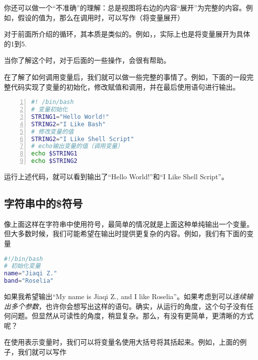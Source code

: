 \begin{extend}
    你还可以做一个“不准确”的理解：\code{\$}总是视图将右边的内容“展开”为完整的内容。例如，假设的值为，那么在调用时，可以写作（将变量展开）

    对于前面所介绍的循环，其本质是类似的。例如，，实际上也是将变量展开为具体的1到5.

    当你了解这个时，对于后面的一些操作，会很有帮助。
\end{extend}

在了解了如何调用变量后，我们就可以做一些完整的事情了。例如，下面的一段完整代码实现了变量的初始化，修改赋值和调用，并在最后使用语句进行输出。

\begin{lstlisting}[language=bash,caption=variable,numbers=left]
#! /bin/bash
# 变量初始化
STRING1="Hello World!"
STRING2="I Like Bash"
# 修改变量的值
STRING2="I Like Shell Script"
# echo输出变量的值（调用变量）
echo $STRING1
echo $STRING2
\end{lstlisting}

运行上述代码，就可以看到输出了“Hello World!”和“I Like Shell Script”。

\subsection{字符串中的\$符号}\label{subsec:变量-字符串中的$符号}

像上面这样在字符串中使用\code{\$}符号，最简单的情况就是上面这种单纯输出一个变量。但大多数时候，我们可能希望在输出时提供更复杂的内容。例如，我们有下面的变量

\begin{lstlisting}[language=bash,caption=dollar\_in\_string]
#!/bin/bash
# 初始化变量
name="Jiaqi Z."
band="Roselia"
\end{lstlisting}

如果我希望输出“My name is Jiaqi Z., and I like Roselia”。如果考虑到可以\emph{连续输出多个参数}，也许你会想写出这样的语句。确实，从运行的角度，这个句子没有任何问题。但显然从可读性的角度，稍显复杂。那么，有没有更简单，更清晰的方式呢？

在使用\code{\$}表示变量时，我们可以将变量名使用大括号将其括起来。例如，上面的例子，我们就可以写作

